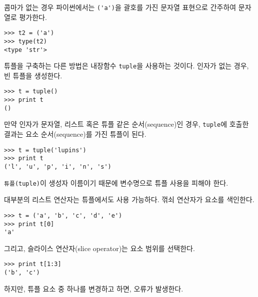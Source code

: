 콤마가 없는 경우 파이썬에서는 \verb"('a')"을 괄호를 가진 문자열 표현으로 간주하여 문자열로 평가한다.

\beforeverb
\begin{verbatim}
>>> t2 = ('a')
>>> type(t2)
<type 'str'>
\end{verbatim}
\afterverb
%

튜플을 구축하는 다른 방법은 내장함수 {\tt tuple}을 사용하는 것이다. 
인자가 없는 경우, 빈 튜플을 생성한다.


\beforeverb
\begin{verbatim}
>>> t = tuple()
>>> print t
()
\end{verbatim}
\afterverb
%

만약 인자가 문자열, 리스트 혹은 튜플 같은 순서(sequence)인 경우, 
{\tt tuple}에 호출한 결과는 요소 순서(sequence)를 가진 튜플이 된다.

\beforeverb
\begin{verbatim}
>>> t = tuple('lupins')
>>> print t
('l', 'u', 'p', 'i', 'n', 's')
\end{verbatim}
\afterverb
%

{\tt 튜플(tuple)}이 생성자 이름이기 때문에 변수명으로 튜플 사용을 피해야 한다.

대부분의 리스트 연산자는 튜플에서도 사용 가능하다. 
꺾쇠 연산자가 요소를 색인한다.


\beforeverb
\begin{verbatim}
>>> t = ('a', 'b', 'c', 'd', 'e')
>>> print t[0]
'a'
\end{verbatim}
\afterverb
%

그리고, 슬라이스 연산자(slice operator)는 요소 범위를 선택한다.


\beforeverb
\begin{verbatim}
>>> print t[1:3]
('b', 'c')
\end{verbatim}
\afterverb
%

하지만, 튜플 요소 중 하나를 변경하고 하면, 오류가 발생한다.



